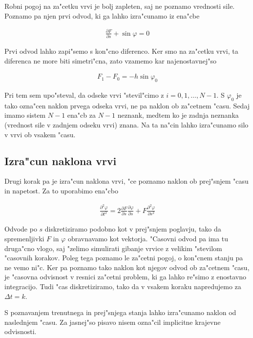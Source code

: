\documentclass[a4paper,10pt]{article}
\renewcommand{\phi}{\varphi}
\newcommand{\parcialno}[2]{
  \frac{\partial #1}{\partial #2}
}
\newcommand{\parcdva}[2]{
  \frac{\partial^2 #1}{\partial #2 ^2}
}
\begin{document}
Robni pogoj na za"cetku vrvi je bolj zapleten, saj ne poznamo vrednosti sile. Poznamo pa njen prvi odvod, ki ga lahko izra"cunamo iz ena"cbe 

\begin{align}
\label{eq:sila-zacetni-pogoj}
 \parcialno{F}{s} + \sin\phi = 0
\end{align}

Prvi odvod lahko zapi"semo s kon"cno diferenco. Ker smo na za"cetku vrvi, ta diferenca ne more biti simetri"cna, zato vzamemo kar najenostavnej"so

\begin{align}
\label{eq:sila-zacetni-pogoj-diskretno}
 F_1 - F_0 = -h\sin\phi_0
\end{align}

Pri tem sem upo"steval, da odseke vrvi "stevil"cimo z $i=0,1,\ldots,N-1$. S $\phi_0$ je tako ozna"cen naklon prvega odseka vrvi, ne pa naklon ob za"cetnem "casu. Sedaj imamo sistem $N-1$ ena"cb za $N-1$ neznank, medtem ko je zadnja neznanka (vrednost sile v zadnjem odseku vrvi) znana. Na ta na"cin lahko izra"cunamo silo v vrvi ob vsakem "casu. 

\subsection{Izra"cun naklona vrvi}

Drugi korak pa je izra"cun naklona vrvi, "ce poznamo naklon ob prej"snjem "casu in napetost. Za to uporabimo ena"cbo

\begin{align}
 \label{eq:kot}
 \parcdva{\phi}{t} = 2\parcialno{F}{s}\parcialno{\phi}{s} + F\parcdva{\phi}{s}
\end{align}

Odvode po $s$ diskretiziramo podobno kot v prej"snjem poglavju, tako da spremenljivki $F$ in $\phi$ obravnavamo kot vektorja. "Casovni odvod pa ima tu druga"cno vlogo, saj "zelimo simulirati gibanje vrvice z velikim "stevilom "casovnih korakov. Poleg tega poznamo le za"cetni pogoj, o kon"cnem stanju pa ne vemo ni"c. Ker pa poznamo tako naklon kot njegov odvod ob za"cetnem "casu, je "casovna odvisnost v resnici za"cetni problem, ki ga lahko re"simo z enostavno integracijo. Tudi "cas diskretiziramo, tako da v vsakem koraku napredujemo za $\Delta t = k$. 

S poznavanjem trenutnega in prej"snjega stanja lahko izra"cunamo naklon od naslednjem "casu. Za jasnej"so pisavo nisem ozna"cil implicitne krajevne odvisnosti. 
\end{document}
